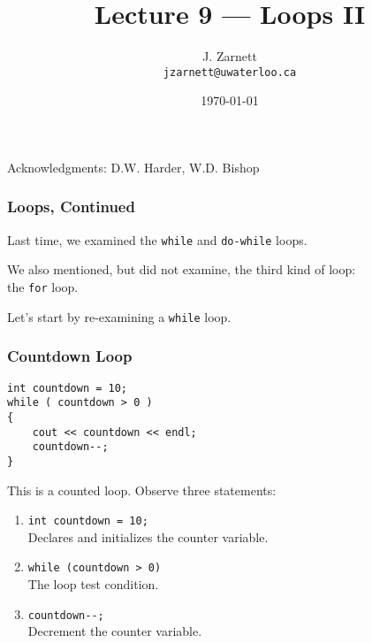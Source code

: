 

\title{Lecture 9 --- Loops II}

\author{J. Zarnett\\
\texttt{jzarnett@uwaterloo.ca}}
\date{\today}



\begin{frame}
  \titlepage
  
  \begin{center}
  \small{Acknowledgments: D.W. Harder, W.D. Bishop}
  \end{center}
 \end{frame}
 

\begin{frame}
\frametitle{Loops, Continued}
Last time, we examined the \texttt{while} and \texttt{do-while} loops.

We also mentioned, but did not examine, the third kind of loop:\\
\quad the \texttt{for} loop.

Let's start by re-examining a \texttt{while} loop.

\end{frame}


\begin{frame}[fragile]
\frametitle{Countdown Loop}

\begin{verbatim}
int countdown = 10;
while ( countdown > 0 ) 
{
    cout << countdown << endl;
    countdown--;
}
\end{verbatim}

This is a counted loop. Observe three statements:
\begin{enumerate}
	\item \texttt{int countdown = 10;}\\
		\quad Declares and initializes the counter variable.
	\item \texttt{while (countdown > 0)}\\
		\quad The loop test condition.
	\item \texttt{countdown{-}{-};}\\
		\quad Decrement the counter variable.
\end{enumerate}

\end{frame}


